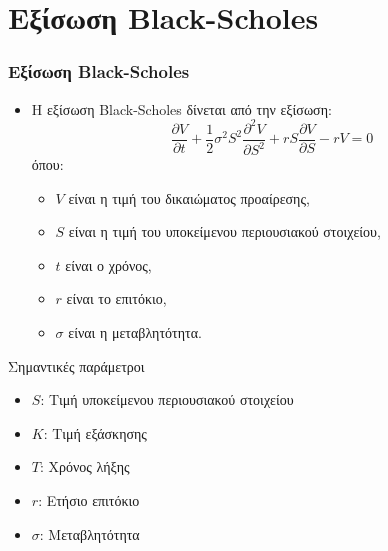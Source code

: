 \section{Εξίσωση Black-Scholes}
\begin{frame}
  \frametitle{Εξίσωση Black-Scholes}
  \begin{itemize}
    \item Η εξίσωση Black-Scholes δίνεται από την εξίσωση:
      \[
        \frac{\partial V}{\partial t} + \frac{1}{2} \sigma^2 S^2 \frac{\partial^2 V}{\partial S^2} + r S \frac{\partial V}{\partial S} - r V = 0
      \]
      όπου:
      \begin{itemize}
        \item \(V\) είναι η τιμή του δικαιώματος προαίρεσης,
        \item \(S\) είναι η τιμή του υποκείμενου περιουσιακού στοιχείου,
        \item \(t\) είναι ο χρόνος,
        \item \(r\) είναι το επιτόκιο,
        \item \(\sigma\) είναι η μεταβλητότητα.
      \end{itemize}
  \end{itemize}
  \begin{block}{Σημαντικές παράμετροι}
    \begin{itemize}
      \item \(S\): Τιμή υποκείμενου περιουσιακού στοιχείου
      \item \(K\): Τιμή εξάσκησης
      \item \(T\): Χρόνος λήξης
      \item \(r\): Ετήσιο επιτόκιο
      \item \(\sigma\): Μεταβλητότητα
    \end{itemize}
  \end{block}
\end{frame}

